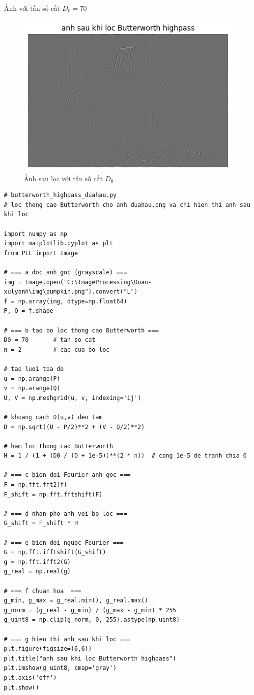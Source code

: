 \documentclass[12pt,a4paper]{report}
\numberwithin{equation}{section}
\theoremstyle{definition} %
\begin{document}
Ảnh với tần số cắt $D_0=70$
\begin{figure}[H]
\centering
\includegraphics[width=0.7\linewidth]{img/butterworthhighpass/anhsaulocD0=70.png}
\caption{Ảnh sau lọc với tần số cắt $D_0$}
\end{figure}

\begin{lstlisting}
# butterworth_highpass_duahau.py
# loc thong cao Butterworth cho anh duahau.png va chi hien thi anh sau khi loc

import numpy as np
import matplotlib.pyplot as plt
from PIL import Image

# === a doc anh goc (grayscale) ===
img = Image.open("C:\ImageProcessing\Doan-xulyanh\img\pumpkin.png").convert("L")
f = np.array(img, dtype=np.float64)
P, Q = f.shape

# === b tao bo loc thong cao Butterworth ===
D0 = 70       # tan so cat
n = 2         # cap cua bo loc

# tao luoi toa do
u = np.arange(P)
v = np.arange(Q)
U, V = np.meshgrid(u, v, indexing='ij')

# khoang cach D(u,v) den tam
D = np.sqrt((U - P/2)**2 + (V - Q/2)**2)

# ham loc thong cao Butterworth
H = 1 / (1 + (D0 / (D + 1e-5))**(2 * n))  # cong 1e-5 de tranh chia 0

# === c bien doi Fourier anh goc ===
F = np.fft.fft2(f)
F_shift = np.fft.fftshift(F)

# === d nhan pho anh voi bo loc ===
G_shift = F_shift * H

# === e bien doi nguoc Fourier ===
G = np.fft.ifftshift(G_shift)
g = np.fft.ifft2(G)
g_real = np.real(g)

# === f chuan hoa  ===
g_min, g_max = g_real.min(), g_real.max()
g_norm = (g_real - g_min) / (g_max - g_min) * 255
g_uint8 = np.clip(g_norm, 0, 255).astype(np.uint8)

# === g hien thi anh sau khi loc ===
plt.figure(figsize=(6,6))
plt.title("anh sau khi loc Butterworth highpass")
plt.imshow(g_uint8, cmap='gray')
plt.axis('off')
plt.show()

\end{lstlisting}
\end{document}
